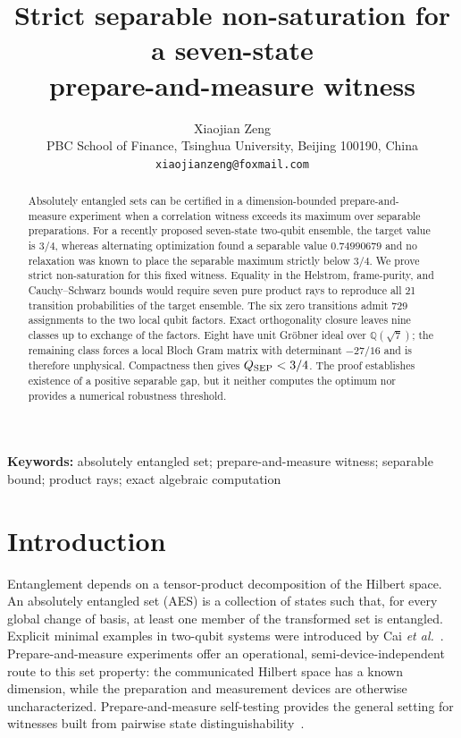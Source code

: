 \documentclass[11pt]{article}
\title{Strict separable non-saturation for a seven-state\\
prepare-and-measure witness}
\author{Xiaojian Zeng\\
\small PBC School of Finance, Tsinghua University, Beijing 100190, China\\
\small \texttt{xiaojianzeng@foxmail.com}}
\date{}
\begin{document}
\maketitle

\begin{abstract}
Absolutely entangled sets can be certified in a dimension-bounded
prepare-and-measure experiment when a correlation witness exceeds its maximum
over separable preparations.  For a recently proposed seven-state two-qubit
ensemble, the target value is $3/4$, whereas alternating optimization found a
separable value $0.74990679$ and no relaxation was known to place the separable
maximum strictly below $3/4$.  We prove strict non-saturation for this fixed
witness.  Equality in the Helstrom, frame-purity, and Cauchy--Schwarz bounds
would require seven pure product rays to reproduce all 21 transition
probabilities of the target ensemble.  The six zero transitions admit 729
assignments to the two local qubit factors.  Exact orthogonality closure leaves
nine classes up to exchange of the factors.  Eight have unit Gr\"obner ideal
over $\mathbb Q(\sqrt7)$; the remaining class forces a local Bloch Gram matrix
with determinant $-27/16$ and is therefore unphysical.  Compactness then gives
$Q_{\rm SEP}<3/4$.  The proof establishes existence of a positive separable
gap, but it neither computes the optimum nor provides a numerical robustness
threshold.
\end{abstract}

\noindent\textbf{Keywords:} absolutely entangled set; prepare-and-measure
witness; separable bound; product rays; exact algebraic computation

\section{Introduction}

Entanglement depends on a tensor-product decomposition of the Hilbert space.
An absolutely entangled set (AES) is a collection of states such that, for
every global change of basis, at least one member of the transformed set is
entangled.  Explicit
minimal examples in two-qubit systems were introduced by Cai \emph{et
al.}~\cite{Cai2021}.  Prepare-and-measure experiments offer an operational,
semi-device-independent route to this set property: the communicated Hilbert
space has a known dimension, while the preparation and measurement devices are
otherwise uncharacterized.  Prepare-and-measure self-testing provides the
general setting for witnesses built from pairwise state
distinguishability~\cite{Navascues2023}.
\end{document}

